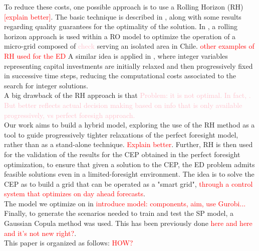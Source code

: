 \indent To reduce these costs, one possible approach is to use a Rolling Horizon (RH) \textcolor{red}{[explain better]}. The basic technique is described in \textcolor{green}{\cite{INTRO_Glomb}}, along with some results regarding quality guarantees for the optimality of the solution. In \textcolor{green}{\cite{INTRO_Palma-Behnke}}, a rolling horizon approach is used within a RO model to optimize the operation of a micro-grid composed of \textcolor{pink}{check} serving an isolated area in Chile. \textcolor{red}{other examples of RH used for the ED} A similar idea is applied in \textcolor{green}{\cite{INTRO_karlsruhe}}, where integer variables representing capital investments are initially relaxed and then progressively fixed in successive time steps, reducing the computational costs associated to the search for integer solutions.\\
\indent A big drawback of the RH approach is that \textcolor{pink}{Problem: it is not optimal. In fact, \cite{INTRO_short-term}. But better reflects actual decision making based on info that is only available progressively, vs perfect foresigh approach.}\\
\indent Our work aims to build a hybrid model, exploring the use of the RH method as a tool to guide progressively tighter relaxations of the perfect foresight model, rather than as a stand-alone technique.  \textcolor{red}{Explain better}. 
Further, RH is then used for the validation of the results for the CEP obtained in the perfect foresight optimization, to ensure that given a solution to the CEP, the ED problem admits feasible solutions even in a limited-foresight environment. The idea is to solve the CEP as to build a grid that can be operated as a "smart grid", \textcolor{red}{through a control system that optimizes on day ahead forecasts}.\\
\indent The model we optimize on in \textcolor{red}{introduce model: components, aim, use Gurobi...}\\
\indent Finally, to generate the scenarios needed to train and test the SP model, a Gaussian Copula method was used. This has been previously done \textcolor{red}{here and here and it's not new right?}.\\

This paper is organized as follows: \textcolor{red}{HOW?}\\

